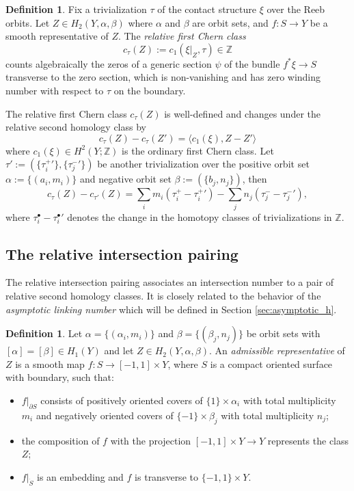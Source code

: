 \documentclass{article}
\numberwithin{equation}{section}
\theoremstyle{definition}
\newtheorem{definition}[theorem]{Definition}
\newcommand{\Z}{\mathbb{Z}}
\begin{document}
\begin{definition}
Fix a trivialization $\tau$ of the contact structure $\xi$ over the Reeb orbits. Let $Z\in H_2(Y, \alpha, \beta)$ where $\alpha$ and $\beta$ are orbit sets, and $f:S \to Y$ be a smooth representative of $Z$. The \emph{relative first Chern class}
$$c_{\tau}(Z):= c_1(\xi|_Z, \tau) \in \Z$$ 
counts algebraically the zeros of a generic section $\psi$ of the bundle $f^*\xi \to S$ transverse to the zero section, which is non-vanishing and has zero winding number with respect to $\tau$ on the boundary.
\end{definition}

The relative first Chern class $c_\tau(Z)$ is well-defined and changes under the relative second homology class by
\begin{equation}
    c_\tau(Z) - c_\tau(Z') = \langle c_1(\xi), Z-Z'\rangle
\end{equation}
where $c_1(\xi) \in H^2(Y; \Z)$ is the ordinary first Chern class. Let $\tau':= (\{{\tau_i^+}'\}, \{{\tau_j^-}'\})$ be another trivialization over the positive orbit set $\alpha:= \{(a_i,m_i)\}$ and negative orbit set $\beta:=(\{b_j,n_j\})$, then
\begin{equation}
    c_\tau(Z) - c_{\tau'}(Z) = \sum_i m_i(\tau_i^+ - {\tau_i^{+}}') - \sum_j n_j(\tau_j^- - {\tau_j^-}'),
\end{equation}
where $\tau_i^\bullet - {\tau_i^{\bullet}}'$ denotes the change in the homotopy classes of trivializations in $\mathbb{Z}$.


\subsection{The relative intersection pairing}
The relative intersection pairing associates an intersection number to a pair of relative second homology classes. It is closely related to the behavior of the \emph{asymptotic linking number} which will be defined in Section \ref{sec:asymptotic_h}.

\begin{definition}
Let $\alpha = \{(\alpha_i, m_i)\}$ and $\beta = \{(\beta_j, n_j)\}$ be orbit sets with $[\alpha] = [\beta] \in H_1(Y)$ and let $Z\in H_2(Y, \alpha, \beta)$. An \emph{admissible representative} of $Z$ is a smooth map $f: S \to [-1,1] \times Y$, where $S$ is a compact oriented surface with boundary, such that:
\begin{itemize}
\item $f|_{\partial S}$ consists of positively oriented covers of $\{1\} \times \alpha_i$ with total multiplicity $m_i$ and negatively oriented covers of $\{-1\} \times \beta_j$ with total multiplicity $n_j$;
\item the composition of $f$ with the projection $[-1,1] \times Y \to Y$ represents the class $Z$; 
\item $f|_{\dot{S}}$ is an embedding and $f$ is transverse to $\{-1,1\} \times Y$. 
\end{itemize}
\end{definition}
\end{document}
